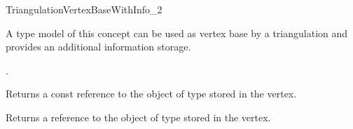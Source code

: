 

\begin{ccRefConcept}{TriangulationVertexBaseWithInfo_2}


\ccDefinition
A type model of this concept can be used as vertex base by a triangulation
and provides an additional information storage.



\ccTypes
{}
{.} 



\ccAccessFunctions
{}

{Returns a const reference to the object of type  stored in the
vertex.} 


{Returns a reference to the object of type  stored in the vertex.} 

\ccHasModels


\end{ccRefConcept}
